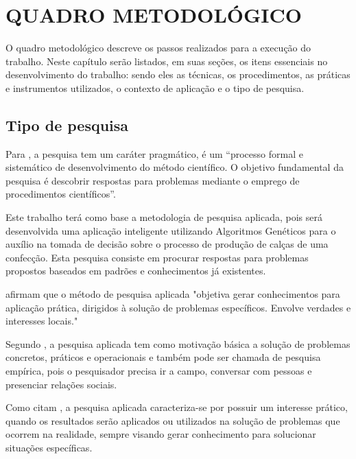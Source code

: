 \chapter{QUADRO METODOLÓGICO}
\par O quadro metodológico descreve os passos realizados para a 
execução do trabalho. Neste capítulo serão listados, em suas seções, os
itens essenciais no desenvolvimento do trabalho: sendo eles as técnicas, os 
procedimentos, as práticas e instrumentos utilizados, o contexto de aplicação 
e o tipo de pesquisa.

\section{Tipo de pesquisa}

\par Para , a pesquisa tem um caráter
pragmático, é um “processo formal e sistemático de desenvolvimento do método científico. 
O objetivo fundamental da pesquisa é descobrir respostas para problemas mediante
o emprego de procedimentos científicos”.

\par Este trabalho terá como base a metodologia de pesquisa aplicada, pois
será desenvolvida uma aplicação inteligente utilizando Algoritmos Genéticos para
o auxílio na tomada de decisão sobre o processo de produção de calças de uma
confecção. Esta pesquisa consiste em procurar respostas para problemas propostos
baseados em padrões e conhecimentos já existentes.

\par {} afirmam que o método de
pesquisa aplicada "objetiva gerar conhecimentos para aplicação prática, dirigidos à
solução de problemas específicos. Envolve verdades e interesses locais."  

\par Segundo , a pesquisa
aplicada tem como motivação básica a solução de problemas
concretos, práticos e operacionais e também pode ser chamada de pesquisa
empírica, pois o pesquisador precisa ir a campo, conversar com pessoas e
presenciar relações sociais.

\par Como citam , a pesquisa aplicada
caracteriza-se por possuir um interesse prático, quando os resultados serão aplicados ou utilizados na
solução de problemas que ocorrem na realidade, sempre visando gerar conhecimento
para solucionar situações específicas.

